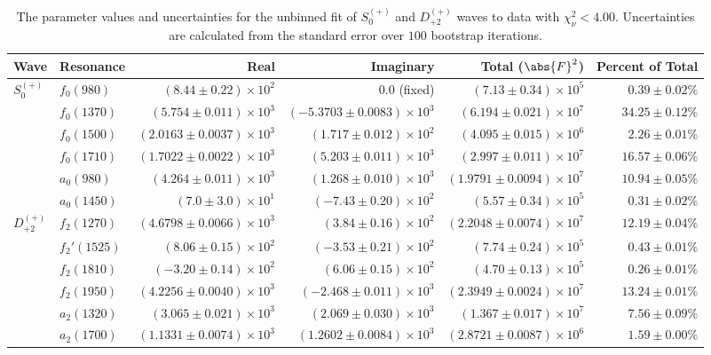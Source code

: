 \begin{table}[ht]
    \begin{center}
        \begin{tabular}{llrrrr}\toprule
        Wave & Resonance & Real & Imaginary & Total ($\abs{F}^2$) & Percent of Total \\\midrule
$S_{0}^{(+)}$ & $f_{0}(980)$ & $(8.44 \pm 0.22) \times 10^{2}$ & $0.0$ (fixed) & $(7.13 \pm 0.34) \times 10^{5}$ & $0.39 \pm 0.02 \%$ \\
 & $f_{0}(1370)$ & $(5.754 \pm 0.011) \times 10^{3}$ & $(-5.3703 \pm 0.0083) \times 10^{3}$ & $(6.194 \pm 0.021) \times 10^{7}$ & $34.25 \pm 0.12 \%$ \\
 & $f_{0}(1500)$ & $(2.0163 \pm 0.0037) \times 10^{3}$ & $(1.717 \pm 0.012) \times 10^{2}$ & $(4.095 \pm 0.015) \times 10^{6}$ & $2.26 \pm 0.01 \%$ \\
 & $f_{0}(1710)$ & $(1.7022 \pm 0.0022) \times 10^{3}$ & $(5.203 \pm 0.011) \times 10^{3}$ & $(2.997 \pm 0.011) \times 10^{7}$ & $16.57 \pm 0.06 \%$ \\
 & $a_{0}(980)$ & $(4.264 \pm 0.011) \times 10^{3}$ & $(1.268 \pm 0.010) \times 10^{3}$ & $(1.9791 \pm 0.0094) \times 10^{7}$ & $10.94 \pm 0.05 \%$ \\
 & $a_{0}(1450)$ & $(7.0 \pm 3.0) \times 10^{1}$ & $(-7.43 \pm 0.20) \times 10^{2}$ & $(5.57 \pm 0.34) \times 10^{5}$ & $0.31 \pm 0.02 \%$ \\
$D_{+2}^{(+)}$ & $f_{2}(1270)$ & $(4.6798 \pm 0.0066) \times 10^{3}$ & $(3.84 \pm 0.16) \times 10^{2}$ & $(2.2048 \pm 0.0074) \times 10^{7}$ & $12.19 \pm 0.04 \%$ \\
 & $f_{2}'(1525)$ & $(8.06 \pm 0.15) \times 10^{2}$ & $(-3.53 \pm 0.21) \times 10^{2}$ & $(7.74 \pm 0.24) \times 10^{5}$ & $0.43 \pm 0.01 \%$ \\
 & $f_{2}(1810)$ & $(-3.20 \pm 0.14) \times 10^{2}$ & $(6.06 \pm 0.15) \times 10^{2}$ & $(4.70 \pm 0.13) \times 10^{5}$ & $0.26 \pm 0.01 \%$ \\
 & $f_{2}(1950)$ & $(4.2256 \pm 0.0040) \times 10^{3}$ & $(-2.468 \pm 0.011) \times 10^{3}$ & $(2.3949 \pm 0.0024) \times 10^{7}$ & $13.24 \pm 0.01 \%$ \\
 & $a_{2}(1320)$ & $(3.065 \pm 0.021) \times 10^{3}$ & $(2.069 \pm 0.030) \times 10^{3}$ & $(1.367 \pm 0.017) \times 10^{7}$ & $7.56 \pm 0.09 \%$ \\
 & $a_{2}(1700)$ & $(1.1331 \pm 0.0074) \times 10^{3}$ & $(1.2602 \pm 0.0084) \times 10^{3}$ & $(2.8721 \pm 0.0087) \times 10^{6}$ & $1.59 \pm 0.00 \%$ \\\bottomrule
        \end{tabular}
    \caption{The parameter values and uncertainties for the unbinned fit of $S_{0}^{(+)}$ and $D_{+2}^{(+)}$ waves to data with $\chi^2_\nu < 4.00$. Uncertainties are calculated from the standard error over $100$ bootstrap iterations.}\label{tab:unbinned-fit-chisqdof-4.0-Sp0p-Dp2p}
    \end{center}
\end{table}
